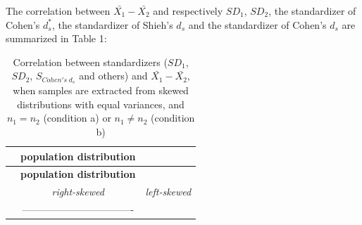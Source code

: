 \documentclass[
  english,
  man]{apa6}
\begin{document}
The correlation between \(\bar{X_1}-\bar{X_2}\) and respectively \(SD_1\), \(SD_2\), the standardizer of Cohen's \(d^*_s\), the standardizer of Shieh's \(d_s\) and the standardizer of Cohen's \(d_s\) are summarized in Table 1:

\begin{longtable}[]{@{}lcc@{}}
\caption{Correlation between standardizers (\(SD_1\), \(SD_2\), \(S_{Cohen's \; d_s}\) and others) and \(\bar{X_1}-\bar{X_2}\), when samples are extracted from skewed distributions with equal variances, and \(n_1=n_2\) (condition a) or \(n_1 \neq n_2\) (condition b)}\tabularnewline
\toprule
\begin{minipage}[b]{0.27\columnwidth}\raggedright
\strut
\end{minipage} & \begin{minipage}[b]{0.29\columnwidth}\centering
\textbf{\textbf{population distribution}}\strut
\end{minipage} & \begin{minipage}[b]{0.35\columnwidth}\centering
\strut
\end{minipage}\tabularnewline
\midrule
\endfirsthead
\toprule
\begin{minipage}[b]{0.27\columnwidth}\raggedright
\strut
\end{minipage} & \begin{minipage}[b]{0.29\columnwidth}\centering
\textbf{\textbf{population distribution}}\strut
\end{minipage} & \begin{minipage}[b]{0.35\columnwidth}\centering
\strut
\end{minipage}\tabularnewline
\midrule
\endhead
\begin{minipage}[t]{0.27\columnwidth}\raggedright
\strut
\end{minipage} & \begin{minipage}[t]{0.29\columnwidth}\centering
\emph{right-skewed}\strut
\end{minipage} & \begin{minipage}[t]{0.35\columnwidth}\centering
\emph{left-skewed}\strut
\end{minipage}\tabularnewline
\begin{minipage}[t]{0.27\columnwidth}\raggedright
\strut
\end{minipage} & \begin{minipage}[t]{0.29\columnwidth}\centering
----------------------------------\strut
\end{minipage} & \begin{minipage}[t]{0.35\columnwidth}\centering

\end{minipage}
\end{longtable}
\end{document}
